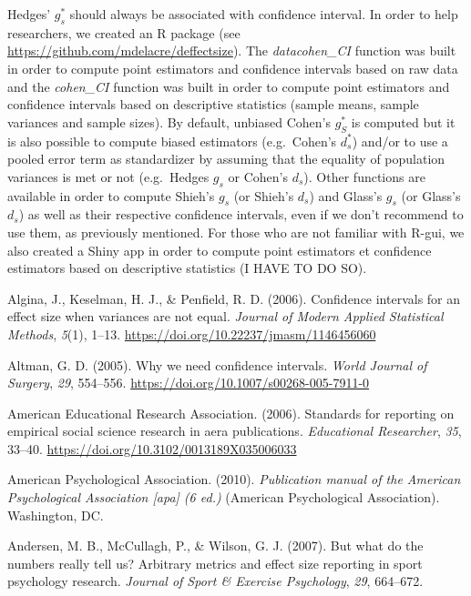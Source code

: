 \documentclass[
  english,
  man,floatsintext]{apa6}
\begin{document}
Hedges' \(g^*_s\) should always be associated with confidence interval. In order to help researchers, we created an R package (see \url{https://github.com/mdelacre/deffectsize}). The \emph{datacohen\_CI} function was built in order to compute point estimators and confidence intervals based on raw data and the \emph{cohen\_CI} function was built in order to compute point estimators and confidence intervals based on descriptive statistics (sample means, sample variances and sample sizes). By default, unbiased Cohen's \(g^*_S\) is computed but it is also possible to compute biased estimators (e.g.~Cohen's \(d^*_s\)) and/or to use a pooled error term as standardizer by assuming that the equality of population variances is met or not (e.g.~Hedges \(g_s\) or Cohen's \(d_s\)). Other functions are available in order to compute Shieh's \(g_s\) (or Shieh's \(d_s\)) and Glass's \(g_s\) (or Glass's \(d_s\)) as well as their respective confidence intervals, even if we don't recommend to use them, as previously mentioned. For those who are not familiar with R-gui, we also created a Shiny app in order to compute point estimators et confidence estimators based on descriptive statistics (I HAVE TO DO SO).

\hypertarget{refs}{}
\leavevmode\hypertarget{ref-Algina_et_al_2006}{}%
Algina, J., Keselman, H. J., \& Penfield, R. D. (2006). Confidence intervals for an effect size when variances are not equal. \emph{Journal of Modern Applied Statistical Methods}, \emph{5}(1), 1--13. \url{https://doi.org/10.22237/jmasm/1146456060}

\leavevmode\hypertarget{ref-Altman_2005}{}%
Altman, G. D. (2005). Why we need confidence intervals. \emph{World Journal of Surgery}, \emph{29}, 554--556. \url{https://doi.org/10.1007/s00268-005-7911-0}

\leavevmode\hypertarget{ref-AERA_2006}{}%
American Educational Research Association. (2006). Standards for reporting on empirical social science research in aera publications. \emph{Educational Researcher}, \emph{35}, 33--40. \url{https://doi.org/10.3102/0013189X035006033}

\leavevmode\hypertarget{ref-APA_2010}{}%
American Psychological Association. (2010). \emph{Publication manual of the American Psychological Association {[}apa{]} (6 ed.)} (American Psychological Association). Washington, DC.

\leavevmode\hypertarget{ref-Andersen_et_al_2007}{}%
Andersen, M. B., McCullagh, P., \& Wilson, G. J. (2007). But what do the numbers really tell us? Arbitrary metrics and effect size reporting in sport psychology research. \emph{Journal of Sport \& Exercise Psychology}, \emph{29}, 664--672.
\end{document}
